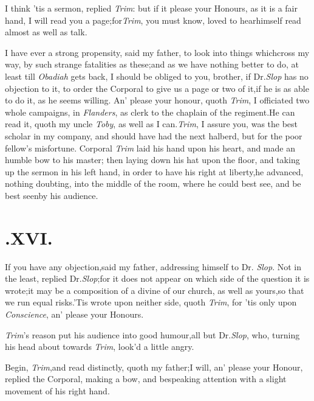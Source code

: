 \documentclass{article}
\begin{document}
I think ’tis a sermon, replied \textit{Trim}:\tsk\break
but if it please your Honours, as it is a fair hand, I will read you a
page;\tsk for\break \textit{Trim}, you must know, loved to
hear\break himself
read almost as well as talk.

I have ever a strong propensity, said my father, to look into
things which\break cross my way, by such strange fatalities\break
as these;\tsk and as we have nothing better to do, at least
till \textit{Obadiah} gets back,
I should be obliged to you, brother, if Dr.\@ \textit{Slop} has no
objection to it, to order the Corporal to give us a page or two of
it,\tsk if he is as able to do it, as he seems willing. An’
please your honour, quoth \textit{Trim}, I officiated two whole
campaigns, in \textit{Flanders}, as clerk to the chaplain of the
regiment.\tsk He can read it, quoth my uncle \textit{Toby},
as well as I can.\tsk \textit{Trim}, I assure you, was the
best scholar in my company, and should have had the next halberd,
but for the poor fellow’s mis\-fortune. Corporal \textit{Trim}
laid his hand upon his heart, and made an humble bow to his
master;\tsk
then laying down his hat upon the floor, and taking up the sermon
in his left hand, in order to have his right at liberty,\tsk he
advanced, nothing doubting, into the middle of the room, where he
could best see, and be best seen\break by his audience.\\
\newpage
\null
\section{.\enspace  XVI.}

\quad\tsh If you have any
objection,\tsk said my father, addressing himself to Dr.\@
\textit{Slop}.\break
Not in the least, replied Dr.\@ \textit{Slop};\tsk for
it does not appear on which side of the question it is
wrote;\tsk it may be a composition of a divine of our church, as
well as yours,\tsk so that we run equal
risks.\tsh ’Tis wrote upon neither side, quoth
\textit{Trim}, for ’tis only upon \textit{Conscience},\break
an’ please your Honours.

\textit{Trim}’s reason put his audience into good
humour,\tsk all but Dr.\@ \textit{Slop}, who,
turning his head about towards \textit{Trim},\break
look’d a little angry.

Begin, \textit{Trim},\tsh and read distinctly, quoth my
father;\tsk I will, an’ please your
Honour, replied the
Corporal, making a bow, and bespeaking attention with a slight
movement of his right hand.
\end{document}
